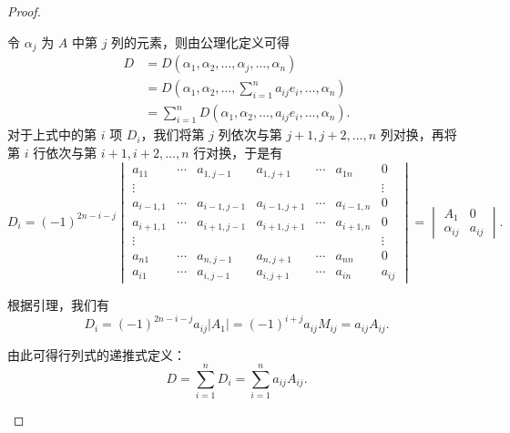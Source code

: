 \begin{proof}
\begin{enumerate}
            令 $\alpha_j$ 为 $A$ 中第 $j$ 列的元素，则由公理化定义可得
            \begin{align*}
                D &= D(\alpha_1, \alpha_2, \ldots, \alpha_j, \ldots, \alpha_n) \\
                  &= D(\alpha_1, \alpha_2, \ldots, \sum_{i=1}^n a_{ij} e_i, \ldots, \alpha_n) \\
                  &= \sum_{i=1}^n D(\alpha_1, \alpha_2, \ldots, a_{ij} e_i, \ldots, \alpha_n).
            \end{align*}
            对于上式中的第 $i$ 项 $D_i$，我们将第 $j$ 列依次与第 $j+1, j+2, \ldots, n$ 列对换，再将第 $i$ 行依次与第 $i+1, i+2, \ldots, n$ 行对换，于是有
            \[
                D_i = (-1)^{2n-i-j} \begin{vmatrix}
                    a_{11}     & \cdots & a_{1, j-1}   & a_{1, j+1}   & \cdots & a_{1n}     & 0      \\
                    \vdots     &        &              &              &        &            & \vdots \\
                    a_{i-1, 1} & \cdots & a_{i-1, j-1} & a_{i-1, j+1} & \cdots & a_{i-1, n} & 0      \\
                    a_{i+1, 1} & \cdots & a_{i+1, j-1} & a_{i+1, j+1} & \cdots & a_{i+1, n} & 0      \\
                    \vdots     &        &              &              &        &            & \vdots \\
                    a_{n1}     & \cdots & a_{n, j-1}   & a_{n, j+1}   & \cdots & a_{nn}     & 0      \\
                    a_{i1}     & \cdots & a_{i, j-1}   & a_{i, j+1}   & \cdots & a_{in}     & a_{ij}
                \end{vmatrix} = \begin{vmatrix}
                    A_1         & 0      \\
                    \alpha_{ij} & a_{ij}
                \end{vmatrix}.
            \]

            根据引理，我们有
            \[
                D_i = (-1)^{2n-i-j} a_{ij} |A_1| = (-1)^{i+j} a_{ij} M_{ij} = a_{ij} A_{ij}.
            \]

            由此可得行列式的递推式定义：
            \[
                D = \sum_{i=1}^n D_i = \sum_{i=1}^n a_{ij} A_{ij}.
            \]


\end{enumerate}
\end{proof}
